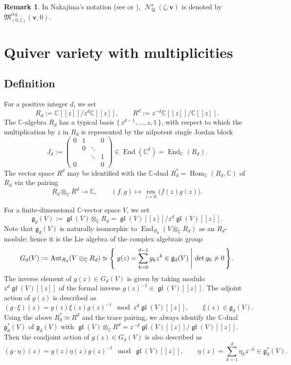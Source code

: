 \documentclass[pdftex]{sigma}
\numberwithin{equation}{section}
\theoremstyle{definition}
\newtheorem{Remark}[Theorem]{Remark}
\newcommand{\C}{\mathbb{C}} %
\newcommand{\gl}{\operatorname{\mathfrak{gl}}}
\newcommand{\g}{\mathfrak{g}} %
\newcommand{\End}{\operatorname{End}}
\newcommand{\Aut}{\operatorname{Aut}}
\newcommand{\Hom}{\operatorname{Hom}}
\newcommand{\bv}{\mathbf{v}}
\newcommand{\lset}[2]%
{\left\{ \, \left. #1 \hspace{0.25em} \right| \, #2 \, \right\} }
\newcommand{\res}{\operatorname*{res}}
\newcommand{\Qst}{\operatorname{\mathscr{N}}^\mathrm{s}}
\newcommand{\QQ}{\mathsf{Q}} %
\begin{document}
\begin{Remark}\label{rem:nakajima}
In Nakajima's notation (see \cite{MR1302318} or \cite{MR2023313}),
$\Qst_\QQ(\zeta,\bv)$ is denoted by
$\mathfrak{M}^\mathrm{reg}_{(0,\zeta)}(\bv,0)$.
\end{Remark}



\section{Quiver variety with multiplicities}\label{sec:q-multi}

\subsection{Def\/inition}\label{subsec:dfn}

For a positive integer $d$, we set
\[
R_d := \C[[z]]/z^d\C[[z]], \qquad R^d := z^{-d}\C[[z]]/\C[[z]].
\]
The $\C$-algebra $R_d$ has a typical basis $\{\, z^{d-1}, \dots ,z,1 \,\}$,
with respect to which
the multiplication by $z$ in $R_d$ is represented by
the nilpotent single Jordan block
\[
J_d := \begin{pmatrix}
                        0     & 1 &        & 0 \\
                              & 0 & \ddots &   \\
                              &   & \ddots & 1   \\
                        0     &   &        & 0 \end{pmatrix}
\in \End(\C^d)=\End_\C(R_d).
\]
The vector space $R^d$ may be identif\/ied with
the $\C$-dual $R_d^* =\Hom_\C (R_d,\C)$ of $R_d$ via the pairing
\[
R_d \otimes_\C R^d \to \C, \qquad (f,g) \mapsto
\res_{z=0} \bigl( f(z)g(z) \bigr).
\]

For a f\/inite-dimensional $\C$-vector space $V$, we set
\[
\g_d(V) :=
\gl(V) \otimes_\C R_d = \gl(V)[[z]]/z^d \gl(V)[[z]].
\]
Note that $\g_d(V)$ is naturally isomorphic to
$\End_{R_d}(V \otimes_\C R_d)$ as an $R_d$-module;
hence it is the Lie algebra of the complex algebraic group
\[
G_d(V) := \Aut_{R_d}(V \otimes_\C R_d) \simeq
\lset{g(z) = \sum_{k=0}^{d-1}g_k z^k \in \g_d(V)}{\det g_0 \neq 0}.
\]
The inverse element of $g(z) \in G_d(V)$ is given by
taking modulo $z^d \gl(V)[[z]]$ of
the formal inverse $g(z)^{-1} \in \gl(V)[[z]]$.
The adjoint action of $g(z)$ is described as
\[
(g \cdot \xi)(z)= g(z)\xi(z)g(z)^{-1} \mod z^d \gl(V)[[z]],
\qquad \xi(z) \in \g_d(V).
\]
Using the above $R_d^* \simeq R^d$ and the trace pairing,
we always identify the $\C$-dual $\g_d^*(V)$ of $\g_d(V)$ with
$\gl(V) \otimes_\C R^d = z^{-d}\gl(V)[[z]]/\gl(V)[[z]]$.
Then the coadjoint action of $g(z) \in G_d(V)$ is also described as
\[
(g \cdot \eta)(z)= g(z)\eta(z)g(z)^{-1} \mod \gl(V)[[z]],
\qquad \eta(z)=\sum_{k=1}^d \eta_k z^{-k} \in \g^*_d(V).
\]
\end{document}
